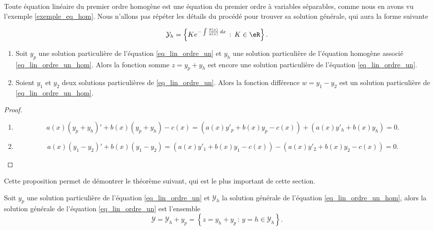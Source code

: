 Toute équation linéaire du premier ordre homogène est une équation du premier ordre à variables séparables, comme nous en avons vu l'exemple \ref{exemple_eq_hom}. Nous n'allons pas répéter les détails du procédé pour trouver sa solution générale, qui aura la forme suivante
\begin{Aretenir}
  \begin{equation}\label{solgeneqlinordre1}
    \mathcal{Y}_h=\left\{Ke^{-\int\frac{b(x)}{a(x)}\, dx}\,:\, K\in\eR\right\}.
  \end{equation}
\end{Aretenir}
\begin{proposition}
  \begin{enumerate}
  \item Soit $y_p$ une solution particulière de l'équation \eqref{eq_lin_ordre_un} et $y_h$ une solution particulière de l'équation homogène associé \eqref{eq_lin_ordre_un_hom}. Alors la fonction somme $z= y_p+y_h$ est encore une solution particulière de l'équation \eqref{eq_lin_ordre_un}.
  \item Soient $y_1$ et $y_2$ deux solutions particulières de \eqref{eq_lin_ordre_un}. Alors la fonction différence $w = y_1-y_2$ est un solution particulière de \eqref{eq_lin_ordre_un_hom}.
  \end{enumerate}
\end{proposition}
\begin{proof}
  \begin{enumerate}
  \item
    \begin{equation}
      a(x)\left(y_p+y_h\right)' + b(x)\left(y_p+y_h\right)-c(x)  =\left( a(x)y'_p+ b(x)y_p-c(x)\right) + \left( a(x)y'_h+ b(x)y_h\right) = 0.
    \end{equation}
  \item
    \begin{equation}
      a(x)\left(y_1-y_2\right)' + b(x)\left(y_1-y_2\right) =\left( a(x)y'_1+ b(x)y_1-c(x)\right) -\left( a(x)y'_2+ b(x)y_2-c(x)\right) = 0.
    \end{equation}
  \end{enumerate}
\end{proof}
Cette proposition permet de démontrer le théorème suivant, qui est le plus important de cette section.
\begin{theorem}
  Soit $y_p$ une solution particulière de l'équation \eqref{eq_lin_ordre_un} et $\mathcal{Y}_h$ la solution générale de l'équation \eqref{eq_lin_ordre_un_hom}, alors la solution générale de l'équation \eqref{eq_lin_ordre_un} est l'ensemble
  \begin{equation}
    \mathcal{Y} = \mathcal{Y}_h +y_p = \left\{z= y_h + y_p\,:\, y=h \in\mathcal{Y}_h \right\}.
  \end{equation}
\end{theorem}
